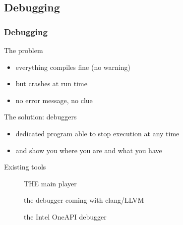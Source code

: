 \subsection[gdb]{Debugging}

\begin{frame}[fragile]
  \frametitle{Debugging}
  \begin{alertblock}{The problem}
    \begin{itemize}
      \item everything compiles fine (no warning)
      \item but crashes at run time
      \item no error message, no clue
    \end{itemize}
  \end{alertblock}
  \pause
  \begin{block}{The solution: debuggers}
    \begin{itemize}
    \item dedicated program able to stop execution at any time
    \item and show you where you are and what you have
    \end{itemize}
  \end{block}
  \pause
  \begin{block}{Existing tools}
    \begin{description}
    \item[\href{http://www.sourceware.org/gdb/}{}]
      THE main player
    \item[\href{http://lldb.llvm.org/}{}]
      the debugger coming with clang/LLVM
    \item[\href{https://www.intel.com/content/www/us/en/develop/documentation/get-started-with-debugging-dpcpp-linux/top.html}{}]
      the Intel OneAPI debugger
    \end{description}
  \end{block}
\end{frame}

